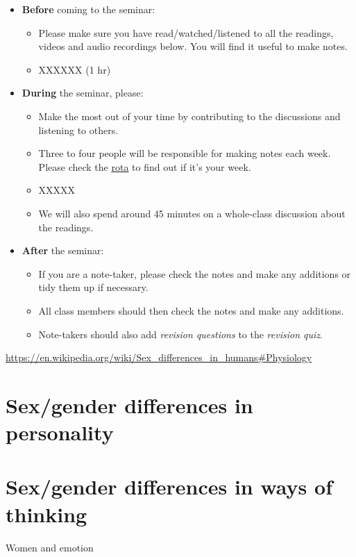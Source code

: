 \documentclass[
]{article}
\providecommand{\tightlist}{%
  \setlength{\itemsep}{0pt}\setlength{\parskip}{0pt}}
\begin{document}
\begin{itemize}
\tightlist
\item
  \textbf{Before} coming to the seminar:

  \begin{itemize}
  \tightlist
  \item
    Please make sure you have read/watched/listened to all the readings,
    videos and audio recordings below. You will find it useful to make
    notes.
  \item
    XXXXXX (1 hr)
  \end{itemize}
\item
  \textbf{During} the seminar, please:

  \begin{itemize}
  \tightlist
  \item
    Make the most out of your time by contributing to the discussions
    and listening to others.
  \item
    Three to four people will be responsible for making notes each week.
    Please check the
    \href{https://www.dropbox.com/s/w92ab1ntub6mytx/PSYM3430\%20Note\%20taking\%20rota.docx?dl=0}{rota}
    to find out if it's your week.
  \item
    XXXXX
  \item
    We will also spend around 45 minutes on a whole-class discussion
    about the readings.
  \end{itemize}
\item
  \textbf{After} the seminar:

  \begin{itemize}
  \tightlist
  \item
    If you are a note-taker, please check the notes and make any
    additions or tidy them up if necessary.
  \item
    All class members should then check the notes and make any
    additions.
  \item
    Note-takers should also add \emph{revision questions} to the
    \emph{revision quiz}.
  \end{itemize}
\end{itemize}

\url{https://en.wikipedia.org/wiki/Sex_differences_in_humans\#Physiology}

\hypertarget{sexgender-differences-in-personality}{%
\section{Sex/gender differences in
personality}\label{sexgender-differences-in-personality}}

\hypertarget{sexgender-differences-in-ways-of-thinking}{%
\section{Sex/gender differences in ways of
thinking}\label{sexgender-differences-in-ways-of-thinking}}

Women and emotion
\end{document}
